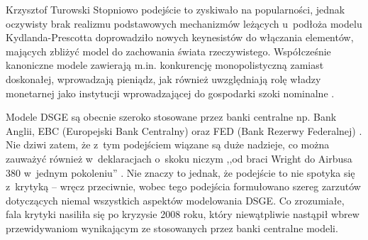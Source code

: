 \begin{artplenv}{Krzysztof Turowski}
Stopniowo podejście to zyskiwało na popularności, jednak oczywisty brak realizmu podstawowych mechanizmów
leżących u~podłoża modelu Kydlanda-Prescotta doprowadziło nowych keynesistów do włączania elementów, mających zbliżyć model do
zachowania świata rzeczywistego. Współcześnie kanoniczne modele zawierają m.in. konkurencję monopolistyczną zamiast
doskonałej, wprowadzają pieniądz, jak również uwzględniają rolę władzy monetarnej jako instytucji wprowadzającej do
gospodarki szoki nominalne
\parencite{fernandez-villaverde_econometrics_2010}.

Modele DSGE są obecnie szeroko stosowane przez banki centralne np. Bank Anglii, EBC (Europejski Bank Centralny) oraz FED (Bank Rezerwy Federalnej)
\parencite{smets_dsge_2010,tovar_dsge_2009}.
Nie dziwi zatem, że z~tym podejściem wiązane są duże
nadzieje, co można zauważyć również w~deklaracjach o~skoku niczym ,,od braci Wright do Airbusa 380 w~jednym pokoleniu''
\parencite{fernandez-villaverde_econometrics_2010}.
Nie znaczy to jednak, że podejście to nie spotyka się z~krytyką
 --  wręcz przeciwnie, wobec tego podejścia formułowano szereg zarzutów dotyczących niemal wszystkich aspektów
modelowania DSGE. Co zrozumiałe, fala krytyki nasiliła się po kryzysie 2008 roku, który
niewątpliwie nastąpił wbrew przewidywaniom wynikającym ze stosowanych przez banki centralne modeli.


\end{artplenv}
